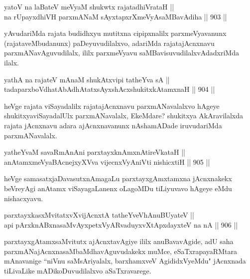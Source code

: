 \begin{shl}
yatoV na laBateV meVyaM shukwtx rajatadhiVrataH || \\
na rUpayxdhiVH parxmANaM sAyxtapxrXmeVyAsaMBavAdiha \hfill || 903 ||  
\end{shl}

\begin{artha}
yAvudariMda rajata budidhxyu mutitxna cipipxnalilx parxmeVyavanunx (rajataveMbudanunx) paDeyuvudilalxvo, adariMda rajatajAcnxnavu parxmANavAguvudilalx, ililx parxmeVyavu saMBavisuvudilalxvAdadxriMda ilalx.
\end{artha}

\begin{shl}
yathA na rajateV mAnaM shukAtxvipi tatheYva sA || \\
tadaparxboVdhatAbAdhAtatxsAyxshAcxshukitxkAtamxnaH \hfill || 904 ||  
\end{shl}

\begin{artha}
heVge rajata viSayadalilx rajatajAcnxnavu parxmANavalalxvo hAgeye shukitxyaviSayadalUlx parxmANavalalx, EkeMdare? shukitxya AkAravilalxda rajata jAcnxnavu adara ajAcnxnavanunx nAshamADade iruvudariMda parxmANavalalx.
\end{artha}


\begin{shl}
yatheYvaM savaRmAnAni parxtayxknAmxnAtireVkataH || \\
anAtamxmeVyaBAcnejxyXVva vijecnxVyAniVti nishicxtiH \hfill || 905 ||  
\end{shl}

\begin{artha}
heVge samasatxjaDavasutxnAmagaLu parxtayxgAmxtamxna jAcnxnakekx beVreyAgi anAtamx viSayagaLanenx oLagoMDu tiLiyuvavo hAgeye eMdu nishacxyavu.
\end{artha}

\begin{shl}
parxtayxkasxMvitatxvXvijAcnxtA tatheYveVhAnuBUyateV || \\
api pArxknABxnasaMvAyxpetxVyARvaduyxvXtApxdayxteV  na nA \hfill || 906 ||  
\end{shl}

\begin{artha}
parxtayxgAtamxsaMvitutx ajAcnxtavAgiye ililx anuBavavAgide, adU saha parxmANajAcnxnasaMbaMdhavAguvudakekx muMce, eSaTxrapayaRMtara mAnavanige ``niVnu saMsAriyalalx, barxhamxveV AgididxVyeMdu" jAcnxnada tiLivaLike mADikoDuvudilalxvo aSaTxravarege.
\end{artha}

